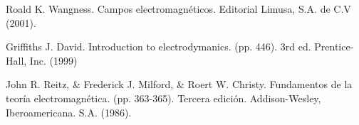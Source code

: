 
\begin{thebibliography}{50}\label{ch:bib}
	 Roald K. Wangness. Campos electromagn\'eticos. Editorial Limusa, S.A. de C.V (2001).

	 Griffiths J. David. Introduction to electrodymanics. (pp. 446). 3rd ed. Prentice-Hall, Inc. (1999)

	 John R. Reitz, \& Frederick J. Milford, \& Roert W. Christy. Fundamentos de la teor\'ia electromagn\'etica. (pp. 363-365). Tercera edici\'on. Addison-Wesley, Iberoamericana. S.A. (1986).


\end{thebibliography}
